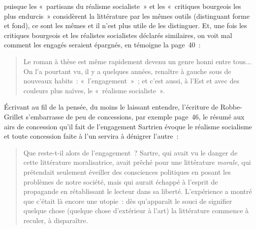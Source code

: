 \documentclass[12pt, a4paper]{article}
\begin{document}
puisque les «~partisans du réalisme socialiste~» et les «~critiques bourgeois les plus endurcis~» considèrent la littérature par les mêmes outils (distinguant forme et fond), ce sont les mêmes et il n'est plus utile de les distinguer. Et, une fois les critiques bourgeois et les réalistes socialistes déclarés similaires, on voit mal comment les engagés seraient épargnés, en témoigne la page~40~:
\begin{quote}
    Le roman à thèse est même rapidement devenu un genre honni entre tous... On l’a pourtant vu, il y a quelques années, renaître à gauche sous de nouveaux habits~: «~l’engagement~»~; et c’est aussi, à l’Est et avec des couleurs plus naïves, le «~réalisme socialiste~».
\end{quote}

Écrivant au fil de la pensée, du moins le laissant entendre, l'écriture de Robbe-Grillet s'embarrasse de peu de concessions, par exemple page~46, le résumé aux airs de concession qu'il fait de l'engagement Sartrien évoque le réalisme socialisme et toute concession faite à l'un servira à dénigrer l'autre~:
\begin{quote}
    Que reste-t-il alors de l’engagement~? Sartre, qui avait vu le danger de cette littérature moralisatrice, avait prêché pour une littérature \textit{morale}, qui prétendait seulement éveiller des consciences politiques en posant les problèmes de notre société, mais qui aurait échappé à l’esprit de propagande en rétablissant le lecteur dans sa liberté. L’expérience a montré que c’était là encore une utopie~: dès qu’apparaît le souci de signifier quelque chose (quelque chose d’extérieur à l’art) la littérature commence à reculer, à disparaître.
\end{quote}
\end{document}
